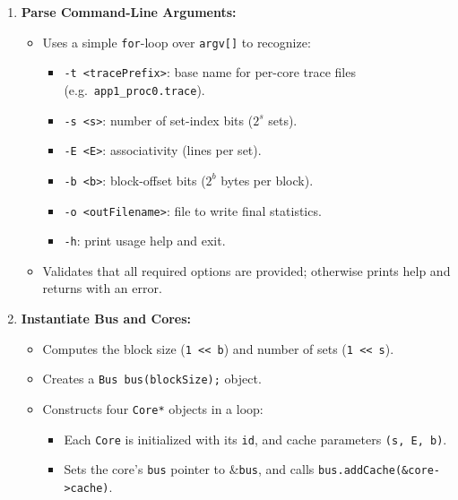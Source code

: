 \documentclass{article}
\begin{document}
\begin{itemize}
\begin{enumerate}
  \item \textbf{Parse Command-Line Arguments:}
    \begin{itemize}
      \item Uses a simple \texttt{for}-loop over \texttt{argv[]} to recognize:
        \begin{itemize}
          \item \texttt{-t <tracePrefix>}: base name for per-core trace files (e.g.\ \texttt{app1\_proc0.trace}).
          \item \texttt{-s <s>}: number of set-index bits ($2^s$ sets).
          \item \texttt{-E <E>}: associativity (lines per set).
          \item \texttt{-b <b>}: block-offset bits ($2^b$ bytes per block).
          \item \texttt{-o <outFilename>}: file to write final statistics.
          \item \texttt{-h}: print usage help and exit.
        \end{itemize}
      \item Validates that all required options are provided; otherwise prints help and returns with an error.
    \end{itemize}

  \item \textbf{Instantiate Bus and Cores:}
    \begin{itemize}
      \item Computes the block size (\texttt{1 << b}) and number of sets (\texttt{1 << s}).
      \item Creates a \texttt{Bus bus(blockSize);} object.
      \item Constructs four \texttt{Core*} objects in a loop:
        \begin{itemize}
          \item Each \texttt{Core} is initialized with its \texttt{id}, and cache parameters \texttt{(s, E, b)}.
          \item Sets the core’s \texttt{bus} pointer to \&\texttt{bus}, and calls \texttt{bus.addCache(\&core->cache)}.
        \end{itemize}
    \end{itemize}


\end{enumerate}
\end{itemize}
\end{document}
